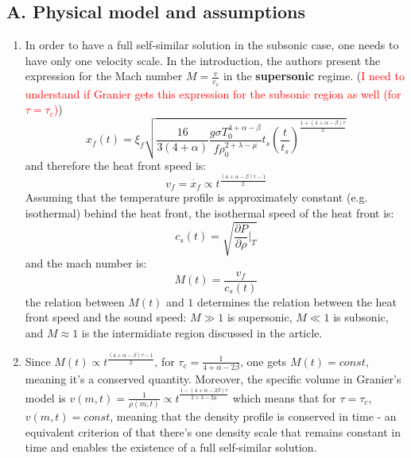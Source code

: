\documentclass[11pt]{article}
\begin{document}
\subsection{A. Physical model and assumptions}
\begin{enumerate}
  \item In order to have a full self-similar solution in the subsonic case, one needs to have only one velocity scale. In the introduction, the authors present the expression for the Mach number $M = \frac{v}{c_s}$ in the \textbf{supersonic} regime. (\textcolor{red}{I need to understand if Granier gets this expression for the subsonic region as well (for $\tau = \tau_c$)})
  \begin{equation}
    x_f (t) = \xi_f \sqrt{\frac{16}{3(4+\alpha)} \frac{g\sigma T_0^{4+\alpha-\beta}}{f\rho_0^{2+\lambda-\mu}}t_s \left(\frac{t}{t_s}\right)^{\frac{1+(4+\alpha-\beta)\tau}{2}}}
  \end{equation}
  and therefore the heat front speed is:
  \begin{equation}
    v_f = \dot{x_f} \propto t^{\frac{(4+\alpha-\beta)\tau-1}{2}}
  \end{equation}
  Assuming that the temperature profile is approximately constant (e.g. isothermal) behind the heat front, the isothermal speed of the heat front is:
  \begin{equation}
    c_s(t) = \sqrt{\frac{\partial P}{\partial \rho} |_T} 
  \end{equation}
  and the mach number is:
  \begin{equation}
    M(t) = \frac{v_f}{c_s(t)} 
  \end{equation}
  the relation between $M(t)$ and $1$ determines the relation between the heat front speed and the sound speed: $M\gg 1$ is supersonic, $M\ll 1$ is subsonic, and $M\approx 1$ is the intermidiate region discussed in the article.
  \item Since $M(t) \propto t^{\frac{(4+\alpha-\beta)\tau-1}{2}}$, for $\tau_c = \frac{1}{4+\alpha-2\beta}$, one gets $M(t) = const$, meaning it's a conserved quantity.
  Moreover, the specific volume in Granier's model is $v(m,t) = \frac{1}{\rho(m,t)} \propto t^{\frac{1-(4+\alpha-2\beta)\tau}{2+\lambda-2\mu}}$ which means that for $\tau = \tau_c$, $v(m,t) = const$, meaning that the density profile is conserved in time - an equivalent criterion of that there's one density scale that remains constant in time and enables the existence of a full self-similar solution.
\end{enumerate}
\end{document}
